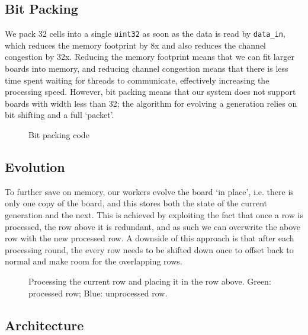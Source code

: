 \documentclass{article}
\begin{document}
    \pagebreak

    \begin{figure}
    \end{figure}

    \subsection{Bit Packing}

    We pack 32 cells into a single \verb|uint32| as soon as the data is read by \verb|data_in|, which reduces the memory footprint by 8x and also reduces the channel congestion by 32x. Reducing the memory footprint means that we can fit larger boards into memory, and reducing channel congestion means that there is less time spent waiting for threads to communicate, effectively increasing the processing speed. However, bit packing means that our system does not support boards with width less than 32; the algorithm for evolving a generation relies on bit shifting and a full `packet'.
    
    \begin{figure}[h]
        
        \caption{Bit packing code}
        \label{fig:bitpack}
    \end{figure}

    \subsection{Evolution}

    To further save on memory, our workers evolve the board `in place', i.e. there is only one copy of the board, and this stores both the state of the current generation and the next. This is achieved by exploiting the fact that once a row is processed, the row above it is redundant, and as such we can overwrite the above row with the new processed row. A downside of this approach is that after each processing round, the every row needs to be shifted down once to offset back to normal and make room for the overlapping rows. 

    \begin{figure}[h]
        \begin{center}
            
            \caption{Processing the current row and placing it in the row above. Green: processed row; Blue: unprocessed row.}
        \end{center}
    \end{figure}

    \subsection{Architecture}
\end{document}

